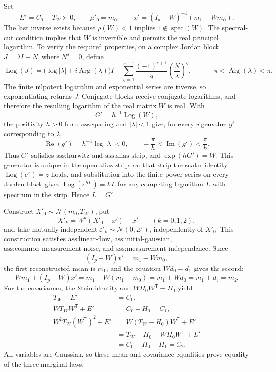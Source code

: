 Set
\[
 E'=C_0-T_W\succ0,
 \qquad \mu'_0=m_0,
 \qquad x'=(I_p-W)^{-1}(m_1-Wm_0).
\]
The last inverse exists because \(\rho(W)<1\) implies \(1\notin\operatorname{spec}(W)\).  The spectral-cut condition implies that \(W\) is invertible and permits the real principal logarithm.  To verify the required properties, on a complex Jordan block \(J=\lambda I+N\), where \(N^s=0\), define
\[
 \operatorname{Log}(J)
 =\bigl(\log|\lambda|+i\operatorname{Arg}(\lambda)\bigr)I
 +\sum_{q=1}^{s-1}\frac{(-1)^{q+1}}q\left(\frac N\lambda\right)^q,
 \qquad -\pi<\operatorname{Arg}(\lambda)<\pi.
\]
The finite nilpotent logarithm and exponential series are inverse, so exponentiating returns \(J\).  Conjugate blocks receive conjugate logarithms, and therefore the resulting logarithm of the real matrix \(W\) is real.  With
\[
 G'=h^{-1}\operatorname{Log}(W),
\]
the positivity \(h>0\) from \(\text{ass:spacing}\) and \(|\lambda|<1\) give, for every eigenvalue \(g'\) corresponding to \(\lambda\),
\[
 \operatorname{Re}(g')=h^{-1}\log|\lambda|<0,
 \qquad
 -\frac\pi h<\operatorname{Im}(g')<\frac\pi h.
\]
Thus \(G'\) satisfies \(\text{ass:hurwitz}\) and \(\text{ass:alias-strip}\), and \(\exp(hG')=W\).  This generator is unique in the open alias strip: on that strip the scalar identity \(\operatorname{Log}(e^z)=z\) holds, and substitution into the finite power series on every Jordan block gives \(\operatorname{Log}(e^{hL})=hL\) for any competing logarithm \(L\) with spectrum in the strip.  Hence \(L=G'\).

Construct \(X'_0\sim\mathcal N(m_0,T_W)\), put
\[
 X'_k=W^k(X'_0-x')+x'\qquad(k=0,1,2),
\]
and take mutually independent \(\varepsilon'_k\sim\mathcal N(0,E')\), independently of \(X'_0\).  This construction satisfies \(\text{ass:linear-flow}\), \(\text{ass:initial-gaussian}\), \(\text{ass:common-measurement-noise}\), and \(\text{ass:measurement-independence}\).  Since
\[
 (I_p-W)x'=m_1-Wm_0,
\]
the first reconstructed mean is \(m_1\), and the equation \(Wd_0=d_1\) gives the second:
\[
 Wm_1+(I_p-W)x'
 =m_1+W(m_1-m_0)
 =m_1+Wd_0=m_1+d_1=m_2.
\]
For the covariances, the Stein identity and \(WH_0W^{\mathsf T}=H_1\) yield
\[
 \begin{aligned}
 T_W+E'&=C_0,\\
 WT_WW^{\mathsf T}+E'&=C_0-H_0=C_1,\\
 W^2T_W(W^{\mathsf T})^2+E'
 &=W(T_W-H_0)W^{\mathsf T}+E'\\
 &=T_W-H_0-WH_0W^{\mathsf T}+E'\\
 &=C_0-H_0-H_1=C_2.
 \end{aligned}
\]
All variables are Gaussian, so these mean and covariance equalities prove equality of the three marginal laws.

